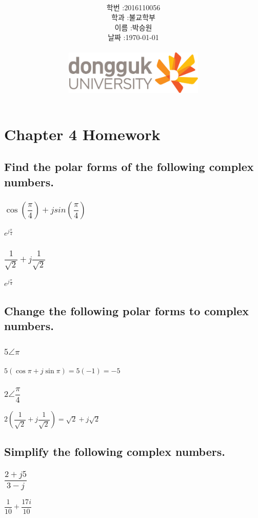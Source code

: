 \documentclass[12pt,a4paper]{article}
\title{
	\centering
	\pgfornament[width=12cm,color=teal]{84}\\
	\vspace{1cm}
	\fontsize{50}{50} \selectfont {정보통신 수학 및 실습\\Homework}\\
		\pgfornament[width=12cm,color=teal]{88}\\
	\vfill}
\author{
	\LARGE
	\begin{tabular}{rl}
		\hline
		학번 : & 2016110056\\ 
		학과 : & 불교학부 \\
		이름 : & 박승원\\
		날짜 : & \today\\
		\hline
	\end{tabular}\vspace{2cm}
	\\
\includegraphics[width=0.5\textwidth]{logo.jpg}
	}
\date{}
\begin{document}
\maketitle
{}
\noindent
\lstset{language=matlab, columns=flexible, tabsize=4, frame=shadowbox, showstringspaces=false, breaklines=true, upquote=true, basicstyle=\normalsize}

\renewcommand{\thesubsubsection}{\alph{subsubsection})}
\renewcommand{\thesubsection}{\arabic{subsection}.}
\newpage
\section*{Chapter 4 Homework}

\subsection{Find the polar forms of the following complex numbers.}

\subsubsection{$\cos(\dfrac{\pi}{4})+jsin(\dfrac{\pi}{4})$}
$e^{j\frac{\pi}{4}}$
\subsubsection{$\dfrac{1}{\sqrt{2}}+j\dfrac{1}{\sqrt{2}}$} 
$e^{j\frac{\pi}{4}}$
\subsection{Change the following polar forms to complex numbers.} 
\subsubsection{$5\angle\pi$}
$5(\cos\pi + j\sin\pi)=5(-1)=-5$
\subsubsection{$2\angle\dfrac{\pi}{4}$}
$2(\dfrac{1}{\sqrt{2}}+j\dfrac{1}{\sqrt{2}})=\sqrt{2}+j\sqrt{2}$
\subsection{Simplify the following complex numbers.} 
\subsubsection{$\dfrac{2+j5}{3-j}$}
$\dfrac{1}{10} + \dfrac{17 i}{10}$
\end{document}
